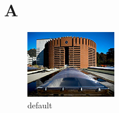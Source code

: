 \chapter{A}

\begin{figure}[htbp]
\begin{center}
\includegraphics{figures/image}
\caption{default}
\label{default}
\end{center}
\end{figure}

